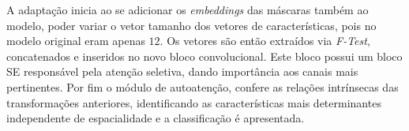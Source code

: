 A adaptação inicia ao se adicionar os \textit{embeddings} das máscaras também ao modelo, poder variar o vetor tamanho dos vetores de características, pois no modelo original eram apenas $12$. Os vetores são então extraídos via \textit{F-Test}, concatenados e inseridos no novo bloco convolucional. Este bloco possui um bloco \gls{SE} responsável pela atenção seletiva, dando importância aos canais mais pertinentes. Por fim o módulo de autoatenção, confere as relações intrínsecas das transformações anteriores, identificando as características mais determinantes independente de espacialidade e a classificação é apresentada.
